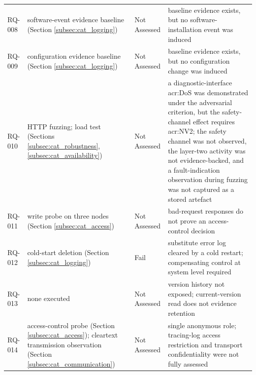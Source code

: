 \begin{xltabular}{\textwidth}{
		p{1.5cm} 
		>{\hsize}X 
		p{2.5cm} 
		>{\hsize}X
	}
	RQ-008 & software-event evidence baseline (Section \ref{subsec:cat_logging}) & Not Assessed & baseline evidence exists, but no software-installation event was induced \\ 
	RQ-009 & configuration evidence baseline (Section \ref{subsec:cat_logging}) & Not Assessed & baseline evidence exists, but no configuration change was induced \\ 
	RQ-010 & HTTP fuzzing; load test (Sections \ref{subsec:cat_robustness}, \ref{subsec:cat_availability}) & Not Assessed & a diagnostic-interface \gls{acr:DoS} was demonstrated under the adversarial criterion, but the safety-channel effect requires \gls{acr:NV2}; the safety channel was not observed, the layer-two activity was not evidence-backed, and a fault-indication observation during fuzzing was not captured as a stored artefact \\ 
	RQ-011 & write probe on three nodes (Section \ref{subsec:cat_access}) & Not Assessed & bad-request responses do not prove an access-control decision \\ 
	RQ-012 & cold-start deletion (Section \ref{subsec:cat_logging}) & Fail & substitute error log cleared by a cold restart; compensating control at system level required \\ 
	RQ-013 & none executed & Not Assessed & version history not exposed; current-version read does not evidence retention \\ 
	RQ-014 & access-control probe (Section \ref{subsec:cat_access}); cleartext transmission observation (Section \ref{subsec:cat_communication}) & Not Assessed & single anonymous role; tracing-log access restriction and transport confidentiality were not fully assessed \\ 
\end{xltabular} 

